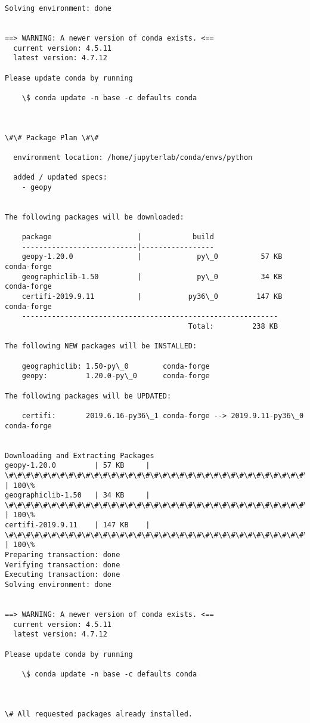 \documentclass[11pt]{article}
\begin{document}
    \begin{Verbatim}[commandchars=\\\{\}]
Solving environment: done


==> WARNING: A newer version of conda exists. <==
  current version: 4.5.11
  latest version: 4.7.12

Please update conda by running

    \$ conda update -n base -c defaults conda



\#\# Package Plan \#\#

  environment location: /home/jupyterlab/conda/envs/python

  added / updated specs:
    - geopy


The following packages will be downloaded:

    package                    |            build
    ---------------------------|-----------------
    geopy-1.20.0               |             py\_0          57 KB  conda-forge
    geographiclib-1.50         |             py\_0          34 KB  conda-forge
    certifi-2019.9.11          |           py36\_0         147 KB  conda-forge
    ------------------------------------------------------------
                                           Total:         238 KB

The following NEW packages will be INSTALLED:

    geographiclib: 1.50-py\_0        conda-forge
    geopy:         1.20.0-py\_0      conda-forge

The following packages will be UPDATED:

    certifi:       2019.6.16-py36\_1 conda-forge --> 2019.9.11-py36\_0 conda-forge


Downloading and Extracting Packages
geopy-1.20.0         | 57 KB     | \#\#\#\#\#\#\#\#\#\#\#\#\#\#\#\#\#\#\#\#\#\#\#\#\#\#\#\#\#\#\#\#\#\#\#\#\# | 100\%
geographiclib-1.50   | 34 KB     | \#\#\#\#\#\#\#\#\#\#\#\#\#\#\#\#\#\#\#\#\#\#\#\#\#\#\#\#\#\#\#\#\#\#\#\#\# | 100\%
certifi-2019.9.11    | 147 KB    | \#\#\#\#\#\#\#\#\#\#\#\#\#\#\#\#\#\#\#\#\#\#\#\#\#\#\#\#\#\#\#\#\#\#\#\#\# | 100\%
Preparing transaction: done
Verifying transaction: done
Executing transaction: done
Solving environment: done


==> WARNING: A newer version of conda exists. <==
  current version: 4.5.11
  latest version: 4.7.12

Please update conda by running

    \$ conda update -n base -c defaults conda



\# All requested packages already installed.

    \end{Verbatim}
\end{document}

